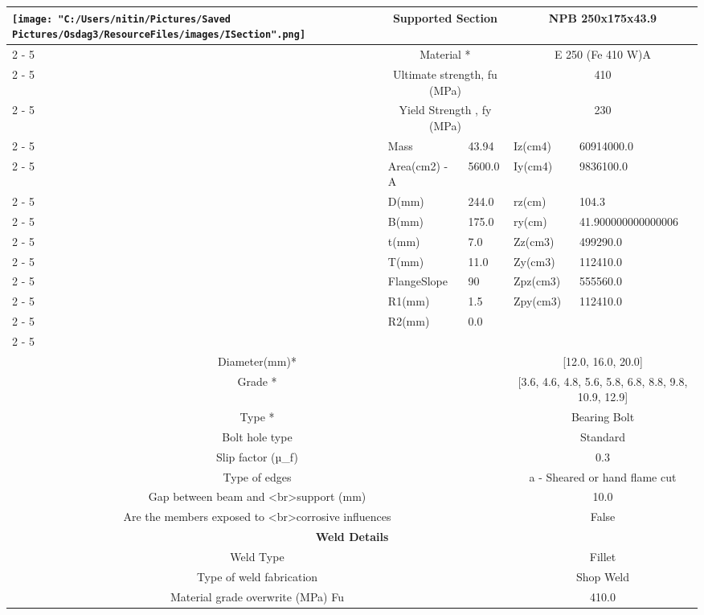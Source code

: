 \documentclass{article}%
\begin{document}
\begin{longtable}{|p{5cm}|p{2cm}|p{2cm}|p{2cm}|p{5cm}|}
\multirow{13}{*}{\texttt{[image: "C:/Users/nitin/Pictures/Saved Pictures/Osdag3/ResourceFiles/images/ISection".png]}}&\multicolumn{2}{|c|}{Supported Section}&\multicolumn{2}{|c|}{NPB 250x175x43.9}\\%
\cline{2%
-%
5}%
&\multicolumn{2}{|c|}{Material *}&\multicolumn{2}{|c|}{E 250 (Fe 410 W)A}\\%
\cline{2%
-%
5}%
&\multicolumn{2}{|c|}{Ultimate strength, fu (MPa)}&\multicolumn{2}{|c|}{410}\\%
\cline{2%
-%
5}%
&\multicolumn{2}{|c|}{Yield Strength , fy (MPa)}&\multicolumn{2}{|c|}{230}\\%
\cline{2%
-%
5}%
&Mass&43.94&Iz(cm4)&60914000.0\\%
\cline{2%
-%
5}%
&Area(cm2) {-} A&5600.0&Iy(cm4)&9836100.0\\%
\cline{2%
-%
5}%
&D(mm)&244.0&rz(cm)&104.3\\%
\cline{2%
-%
5}%
&B(mm)&175.0&ry(cm)&41.900000000000006\\%
\cline{2%
-%
5}%
&t(mm)&7.0&Zz(cm3)&499290.0\\%
\cline{2%
-%
5}%
&T(mm)&11.0&Zy(cm3)&112410.0\\%
\cline{2%
-%
5}%
&FlangeSlope&90&Zpz(cm3)&555560.0\\%
\cline{2%
-%
5}%
&R1(mm)&1.5&Zpy(cm3)&112410.0\\%
\cline{2%
-%
5}%
&R2(mm)&0.0&&\\%
\cline{2%
-%
5}%
\hline%
\multicolumn{5}{|c|}{\textbf{Bolt Details}}\\%
\hline%
\hline%
\multicolumn{3}{|c|}{Diameter(mm)*}&\multicolumn{2}{|c|}{{[}12.0, 16.0, 20.0{]}}\\%
\hline%
\hline%
\multicolumn{3}{|c|}{Grade *}&\multicolumn{2}{|c|}{{[}3.6, 4.6, 4.8, 5.6, 5.8, 6.8, 8.8, 9.8, 10.9, 12.9{]}}\\%
\hline%
\hline%
\multicolumn{3}{|c|}{Type *}&\multicolumn{2}{|c|}{Bearing Bolt}\\%
\hline%
\hline%
\multicolumn{3}{|c|}{Bolt hole type}&\multicolumn{2}{|c|}{Standard}\\%
\hline%
\hline%
\multicolumn{3}{|c|}{Slip factor (µ\_f)}&\multicolumn{2}{|c|}{0.3}\\%
\hline%
\hline%
\multicolumn{3}{|c|}{Type of edges}&\multicolumn{2}{|c|}{a {-} Sheared or hand flame cut}\\%
\hline%
\hline%
\multicolumn{3}{|c|}{Gap between beam and <br>support (mm)}&\multicolumn{2}{|c|}{10.0}\\%
\hline%
\hline%
\multicolumn{3}{|c|}{Are the members exposed to <br>corrosive influences}&\multicolumn{2}{|c|}{False}\\%
\hline%
\hline%
\multicolumn{5}{|c|}{\textbf{Weld Details}}\\%
\hline%
\hline%
\multicolumn{3}{|c|}{Weld Type}&\multicolumn{2}{|c|}{Fillet}\\%
\hline%
\hline%
\multicolumn{3}{|c|}{Type of weld fabrication}&\multicolumn{2}{|c|}{Shop Weld}\\%
\hline%
\hline%
\multicolumn{3}{|c|}{Material grade overwrite (MPa) Fu}&\multicolumn{2}{|c|}{410.0}\\%
\hline%
\end{longtable}
\end{document}
